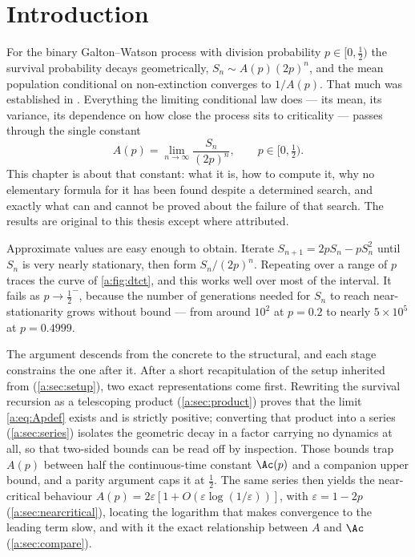 \section{Introduction}
\label{a:sec:intro}

For the binary Galton--Watson process with division probability $p\in[0,\tfrac12)$
the survival probability decays geometrically, $S_n\sim A(p)(2p)^n$, and the mean
population conditional on non-extinction converges to $1/A(p)$. That much was
established in \ChM. Everything the limiting conditional law does --- its mean, its
variance, its dependence on how close the process sits to criticality --- passes
through the single constant
\begin{equation}
\label{a:eq:Apdef}
A(p) = \lim_{n\to\infty}\frac{S_n}{(2p)^n},
\qquad p\in[0,\tfrac12) .
\end{equation}
This chapter is about that constant: what it is, how to compute it, why no
elementary formula for it has been found despite a determined search, and exactly
what can and cannot be proved about the failure of that search. The results are
original to this thesis except where attributed.

Approximate values are easy enough to obtain. Iterate
$S_{n+1}=2pS_n-pS_n^2$ until $S_n$ is very nearly stationary, then form
$S_n/(2p)^n$. Repeating over a range of $p$ traces the curve of
\cref{a:fig:dtct}, and this works well over most of the interval. It fails as
$p\to\tfrac12^-$, because the number of generations needed for $S_n$ to reach
near-stationarity grows without bound --- from around $10^2$ at $p=0.2$ to nearly
$5\times10^5$ at $p=0.4999$.

The argument descends from the concrete to the structural, and each stage
constrains the one after it. After a short recapitulation of the setup inherited
from \ChM{} (\cref{a:sec:setup}), two exact representations come first. Rewriting
the survival recursion as a telescoping product (\cref{a:sec:product}) proves that
the limit \cref{a:eq:Apdef} exists and is strictly positive; converting that
product into a series (\cref{a:sec:series}) isolates the geometric decay in a
factor carrying no dynamics at all, so that two-sided bounds can be read off by
inspection. Those bounds trap $A(p)$ between half the continuous-time constant
$\Ac(p)$ and a companion upper bound, and a parity argument caps it at $\tfrac12$.
The same series then yields the near-critical behaviour
$A(p) = 2\varepsilon[1+O(\varepsilon\log(1/\varepsilon))]$, with
$\varepsilon = 1-2p$ (\cref{a:sec:nearcritical}), locating the logarithm that makes
convergence to the leading term slow, and with it the exact relationship between
$A$ and $\Ac$ (\cref{a:sec:compare}).


